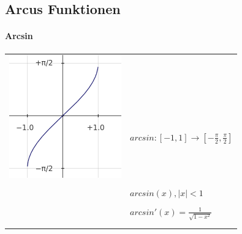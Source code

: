 \documentclass{article}
\begin{document}


\subsection{Arcus Funktionen\newline}

\paragraph{Arcsin}
\begin{tabular}{ l l }
\multirow{3}{*}{\includegraphics[scale=0.5]{png/arcsin.png}} & \\ \\
 & $ arcsin : [-1, 1] \to \left[-\frac{\pi}{2}, \frac{\pi}{2}\right] $ \\ \\
 & $ arcsin(x), |x|<1 $ \\ \\
 & $ arcsin'(x) = \frac{1}{\sqrt{1-x^2}} $ \\ \\ \\
\hline
\end{tabular}

\vspace{2ex}

\end{document}
